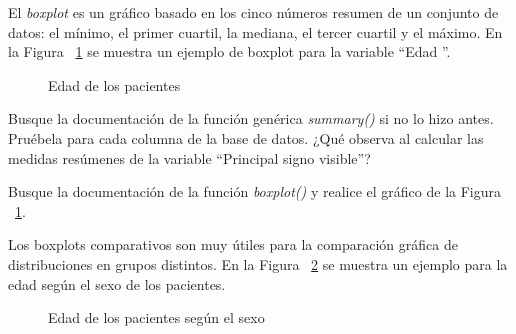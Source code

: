 \documentclass{prob}
\begin{document}
	\begin{problema}
	El \textit{boxplot} es un gráfico basado en los cinco números resumen de un conjunto de datos: el mínimo, el primer cuartil, la mediana, el tercer cuartil y el máximo. En la Figura ~\ref{fig:boxplot} se muestra un ejemplo de boxplot para la variable \textquotedblleft Edad \textquotedblright .

\begin{figure}[!ht]
    \centering
    
    \caption{Edad de los pacientes}
    \label{fig:boxplot}
\end{figure}	


	\begin{parte}
	Busque la documentación de la función genérica \textit{summary()} si no lo hizo antes. Pruébela para cada columna de la base de datos. ¿Qué observa al calcular las medidas resúmenes de la variable \textquotedblleft Principal signo visible\textquotedblright ?
	\end{parte}	
	
	\begin{parte}
	Busque la documentación de la función \textit{boxplot()} y realice el gráfico de la 	Figura ~\ref{fig:boxplot}.
	\end{parte}
	
	\begin{parte}
	Los boxplots comparativos son muy útiles para la comparación gráfica de distribuciones en grupos
distintos. En la Figura ~\ref{fig:boxplot2} se muestra un ejemplo para la edad según el sexo de los pacientes.

\begin{figure}[!ht]
    \centering
    
    \caption{Edad de los pacientes según el sexo}
    \label{fig:boxplot2}
\end{figure}	


\end{parte}
\end{problema}
\end{document}
